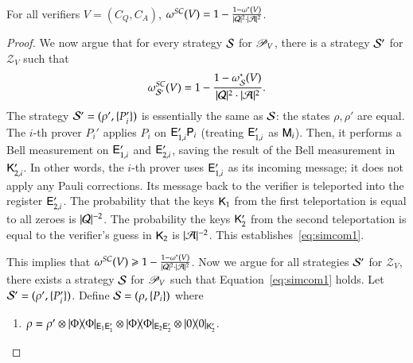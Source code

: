\begin{lemma}
\label{lem:convert_to_simcom}
	For all verifiers $V = (C_Q,C_A)$, $\omega^{SC}(V) = 1 - \frac{1 - \omega^*(V)}{|\mathcal Q|^2 \cdot |\mathcal A|^2}$. 
\end{lemma}
\begin{proof}
	We now argue that for every strategy $\mathcal{S}$ for $\mathscr{P}_V$, there is a strategy $\mathcal{S}'$ for $\mathscr{Z}_V$ such that
	\begin{equation}
	\label{eq:simcom1}
		\omega^{SC}_{\strat'}(V) = 1 - \frac{1 - \omega^*_\strat(V)}{|\cQ|^2 \cdot |\cA|^2}.
	\end{equation}
	The strategy $\mathcal{S}' = (\rho',\{P_i'\})$ is essentially the same as $\mathcal{S}$: the states $\rho,\rho'$ are equal. The $i$-th prover $P_i'$ applies $P_i$ on ${\mathsf{E}}_{1,i}' {\mathsf{P}}_i$ (treating ${\mathsf{E}}_{1,i}'$ as ${\mathsf{M}}_i$). Then, it performs a Bell measurement on ${\mathsf{E}}_{1,i}'$ and ${\mathsf{E}}_{2,i}'$, saving the result of the Bell measurement in ${\mathsf{K}}_{2,i}'$. In other words, the $i$-th prover uses ${\mathsf{E}}_{1,i}'$ as its incoming message; it does not apply any Pauli corrections. Its message back to the verifier is teleported into the register ${\mathsf{E}}_{2,i}'$. The probability that the keys ${\mathsf{K}}_1$ from the first teleportation is equal to all zeroes is $|\mathcal Q|^{-2}$. The probability the keys ${\mathsf{K}}_2'$ from the second teleportation is equal to the verifier's guess in ${\mathsf{K}}_2$ is $|\mathcal A|^{-2}$. This establishes~\eqref{eq:simcom1}.
	
	This implies that $\omega^{SC}(V) \geqslant 1 - \frac{1 - \omega^*(V)}{|\mathcal Q|^2 \cdot |\mathcal A|^2}$. Now we argue for all strategies $\mathcal{S}'$ for $\mathscr{Z}_{V}$, there exists a strategy $\mathcal{S}$ for $\mathscr{P}_V$ such that Equation~\eqref{eq:simcom1} holds. Let $\mathcal{S}' = (\rho',\{ P_i' \})$. Define $\mathcal{S} = (\rho,\{P_i\})$ where
	\begin{enumerate}
		\item $\rho = \rho' \otimes |\Phi\rangle\! \langle \Phi|_{{\mathsf{E}}_1 {\mathsf{E}}_1'} \otimes |\Phi\rangle\! \langle \Phi|_{{\mathsf{E}}_2 {\mathsf{E}}_2'} \otimes |0\rangle\! \langle 0|_{{\mathsf{K}}_2'}$. 
		

\end{enumerate}
\end{proof}
